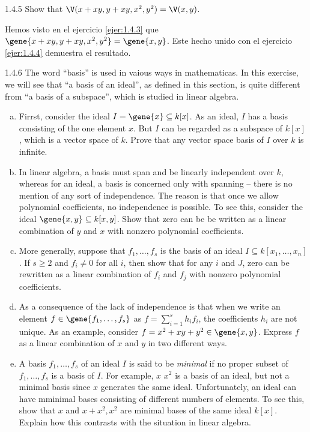 \documentclass[twoside]{article}
\begin{document}
\newpage

\begin{ejercicio}{1.4.5}
Show that $\V(x+xy,y+xy,x^2,y^2) = \V(x,y)$.
\end{ejercicio}
\begin{solucion}
Hemos visto en el ejercicio \ref{ejer:1.4.3} que $\gene{x+xy,y+xy,x^2,y^2} = \gene{x,y}$.
Este hecho unido con el ejercicio \ref{ejer:1.4.4} demuestra el resultado.
\end{solucion}

\newpage

\begin{ejercicio}{1.4.6}
The word ``basis'' is used in vaious ways in mathematicas.
In this exercise, we will see that ``a basis of an ideal'', as defined in this section, is quite different from ``a basis of a subspace'', which is studied in linear algebra.
\begin{enumerate}[a.]
\item Firrst, consider the ideal $I = \gene{x} \subseteq k[x]$.
As an ideal, $I$ has a basis consisting of the one element $x$.
But $I$ can be regarded as a subspace of $k[x]$, which is a vector space of $k$.
Prove that any vector space basis of $I$ over $k$ is infinite.
\item In linear algebra, a basis must span and be linearly independent over $k$, whereas for an ideal, a basis is concerned only with spanning -- there is no mention of any sort of independence.
The reason is that once we allow polynomial coefficients, no independence is possible.
To see this, consider the ideal $\gene{x,y} \subseteq k[x,y]$.
Show that zero can be be written as a linear combination of $y$ and $x$ with nonzero polynomial coefficients.
\item More generally, suppose that $f_1,\dots,f_s$ is the basis of an ideal $I \subseteq k[x_1,\dots,x_n]$.
If $s ≥ 2$ and $f_i \neq 0$ for all $i$, then show that for any $i$ and $J$, zero can be rewritten as a linear combination of $f_i$ and $f_j$ with nonzero polynomial coefficients.
\item As a consequence of the lack of independence is that when we write an element $f \in \gene{f_1,\dots,f_s}$ as $f = \sum_{i=1}^s h_i f_i$, the coefficients $h_i$ are not unique.
As an example, consider $f = x^2 + xy + y^2 \in \gene{x,y}$.
Express $f$ as a linear combination of $x$ and $y$ in two different ways.
\item A basis $f_1,\dots,f_s$ of an ideal $I$ is said to be \emph{minimal} if no proper subset of $f_1,\dots,f_s$ is a basis of $I$. For example, $x$ $x^2$ is a basis of an ideal, but not a minimal basis since $x$ generates the same ideal.
Unfortunately, an ideal can have mminimal bases consisting of different numbers of elements.
To see this, show that $x$ and $x+x^2,x^2$ are minimal bases of the same ideal $k[x]$. Explain how this contrasts with the situation in linear algebra.
\end{enumerate}
\end{ejercicio}
\end{document}
